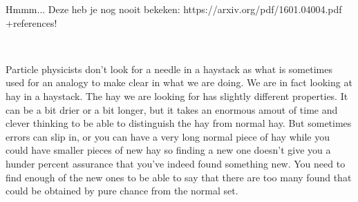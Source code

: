 Hmmm... Deze heb je nog nooit bekeken: https://arxiv.org/pdf/1601.04004.pdf +references!

~\vfill

Particle physicists don't look for a needle in a haystack as what is sometimes used for an analogy to make clear in what we are doing. We are in fact looking at hay in a haystack. The hay we are looking for has slightly different properties. It can be a bit drier or a bit longer, but it takes an enormous amout of time and clever thinking to be able to distinguish the hay from normal hay. But sometimes errors can slip in, or you can have a very long normal piece of hay while you could have smaller pieces of new hay so finding a new one doesn't give you a hunder percent assurance that you've indeed found something new. You need to find enough of the new ones to be able to say that there are too many found that could be obtained by pure chance from the normal set.